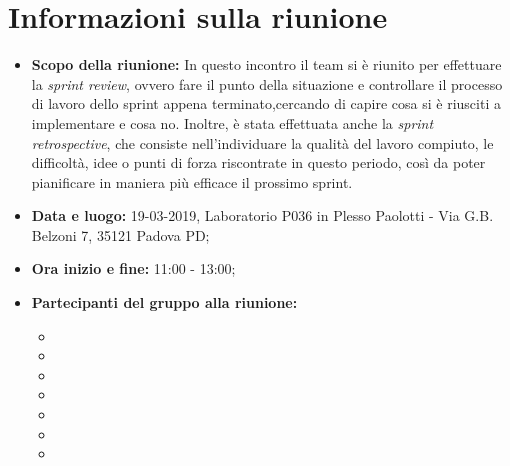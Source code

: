\clearpage
\section{Informazioni sulla riunione}
\begin{itemize}
	\item \textbf {Scopo della riunione:} In questo incontro il team si è riunito per effettuare la \textit{sprint review}, ovvero fare il punto della situazione e controllare il processo di lavoro dello sprint appena terminato,cercando di capire cosa si è riusciti a implementare e cosa no. Inoltre, è stata effettuata anche la \textit{sprint retrospective}, che consiste nell'individuare la qualità del lavoro compiuto, le difficoltà, idee o punti di forza riscontrate in questo periodo, così da poter pianificare in maniera più efficace il prossimo sprint.
	\item \textbf {Data e luogo:} 19-03-2019, Laboratorio P036 in Plesso Paolotti - Via G.B. Belzoni 7, 35121 Padova PD;
	\item \textbf {Ora inizio e fine:} 11:00 - 13:00;
	\item \textbf {Partecipanti del gruppo alla riunione:} 
		 \begin{itemize}
			\item \sonia
			\item \pardeep
			\item \luca
			\item \matteo
			\item \alberto
			\item \alessandro
			\item \andrea
		\end{itemize}
\end{itemize}